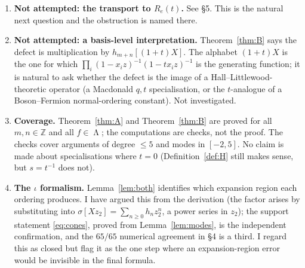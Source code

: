 \documentclass[11pt]{article}
\theoremstyle{definition}
\DeclareMathOperator{\Lam}{\Lambda}
\newcommand{\Z}{\mathbb{Z}}
\begin{document}
\begin{enumerate}
\item \textbf{Not attempted: the transport to $R_e(t)$.} See \S5. This is the natural next
question and the obstruction is named there.
\item \textbf{Not attempted: a basis-level interpretation.} Theorem~\ref{thm:B} says the
defect is multiplication by $h_{m+n}[(1+t)X]$. The alphabet $(1+t)X$ is the one for which
$\prod_i(1-x_iz)^{-1}(1-tx_iz)^{-1}$ is the generating function; it is natural to ask whether
the defect is the image of a Hall--Littlewood-theoretic operator (a Macdonald $q,t$
specialisation, or the $t$-analogue of a Boson--Fermion normal-ordering constant). Not
investigated.
\item \textbf{Coverage.} Theorem~\ref{thm:A} and Theorem~\ref{thm:B} are proved for all
$m,n\in\Z$ and all $f\in\Lam$; the computations are checks, not the proof. The checks cover
arguments of degree $\le5$ and modes in $[-2,5]$. No claim is made about specialisations where
$t=0$ (Definition~\ref{def:H} still makes sense, but $s=t^{-1}$ does not).
\item \textbf{The $\iota$ formalism.} Lemma~\ref{lem:both} identifies which expansion region
each ordering produces. I have argued this from the derivation (the factor arises by
substituting into $\sigma[Xz_2]=\sum_{n\ge0}h_nz_2^n$, a power series in $z_2$); the support
statement \eqref{eq:cones}, proved from Lemma~\ref{lem:modes}, is the independent confirmation,
and the $65/65$ numerical agreement in \S4 is a third. I regard this as closed but flag it as
the one step where an expansion-region error would be invisible in the final formula.
\end{enumerate}
\end{document}
